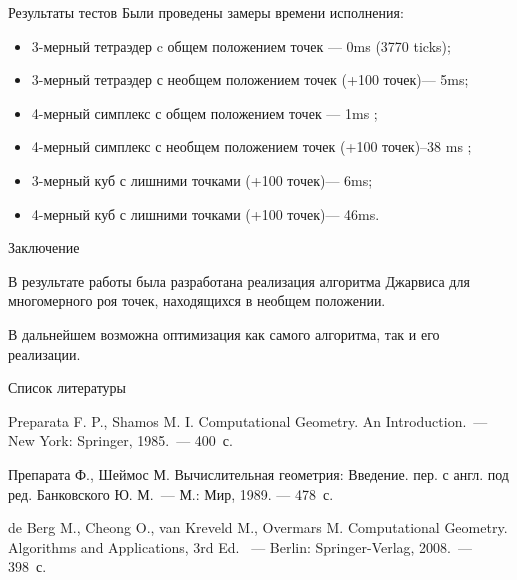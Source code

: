 \documentclass[]{beamer} %
\begin{document}
\begin{frame}{Результаты тестов}
    Были проведены замеры времени исполнения:
    \begin{itemize}
        \item 3-мерный тетраэдер c общем положением точек --- 0ms (3770 ticks);
        \item 3-мерный тетраэдер с необщем положением точек (+100 точек)--- 5ms;
        \item 4-мерный симплекс с общем положением точек --- 1ms ;
        \item 4-мерный симплекс с необщем положением точек (+100 точек)--38 ms ;
        \item 3-мерный куб с лишними точками  (+100 точек)--- 6ms;
        \item 4-мерный куб с лишними точками  (+100 точек)--- 46ms.
    \end{itemize}
\end{frame}

\begin{frame}{Заключение}

    В результате работы была разработана реализация алгоритма Джарвиса  для многомерного роя точек, находящихся в необщем положении.

    \smallskip

    В дальнейшем возможна оптимизация как самого алгоритма, так и его реализации.
\end{frame}

\begin{frame}
\end{frame}

\begin{frame}{Список литературы}
    \begin{thebibliography}{9}
         Preparata F. P., Shamos M. I. Computational Geometry. An Introduction.~--- New York: Springer, 1985.~--- 400~с.

         Препарата Ф., Шеймос М. Вычислительная геометрия: Введение. пер. с англ. под ред. Банковского Ю. М.~--- М.: Мир, 1989. --- 478~с.

         de Berg M., Cheong O., van Kreveld M., Overmars M. Computational Geometry. Algorithms and Applications, 3rd Ed. ~--- Berlin: Springer-Verlag, 2008.~--- 398~с.
        \end{thebibliography}
\end{frame}
\end{document}
